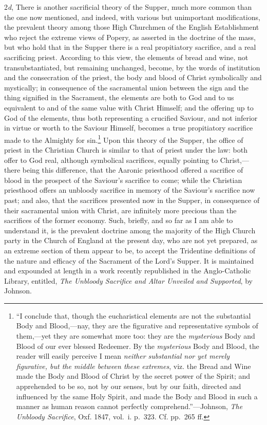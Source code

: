 \documentclass[english,]{book}
\begin{document}
2\emph{d}, There is another sacrificial theory of the Supper, much more common than the one now mentioned, and indeed, with various but unimportant modifications, the prevalent theory among those High Churchmen of the English Establishment who reject the extreme views of Popery, as asserted in the doctrine of the mass, but who hold that in the Supper there is a real propitiatory sacrifice, and a real sacrificing priest. According to this view, the elements of bread and wine, not transubstantiated, but remaining unchanged, become, by the words of institution and the consecration of the priest, the body and blood of Christ symbolically and mystically; in consequence of the sacramental union between the sign and the thing signified in the Sacrament, the elements are both to God and to us equivalent to and of the same value with Christ Himself; and the offering up to God of the elements, thus both representing a crucified Saviour, and not inferior in virtue or worth to the Saviour Himself, becomes a true propitiatory sacrifice made to the Almighty for sin.\footnote{``I conclude that, though the eucharistical elements are not the substantial Body and Blood,---nay, they are the figurative and representative symbols of them,---yet they are somewhat more too: they are the \emph{mysterious} Body and Blood of our ever blessed Redeemer. By the \emph{mysterious} Body and Blood, the reader will easily perceive I mean \emph{neither substantial nor yet merely figurative, but the middle between these extremes}, viz. the Bread and Wine made the Body and Blood of Christ by the secret power of the Spirit; and apprehended to be so, not by our senses, but by our faith, directed and influenced by the same Holy Spirit, and made the Body and Blood in such a manner as human reason cannot perfectly comprehend.''---Johnson, \emph{The Unbloody Sacrifice}, Oxf. 1847, vol.~i. p.~323. Cf. pp.~265 ff.} Upon this theory of the Supper, the office of priest in the Christian Church is similar to that of priest under the law: both offer to God real, although symbolical sacrifices, equally pointing to Christ,---there being this difference, that the Aaronic priesthood offered a sacrifice of blood in the prospect of the Saviour's sacrifice to come; while the Christian priesthood offers an unbloody sacrifice in memory of the Saviour's sacrifice now past; and also, that the sacrifices presented now in the Supper, in consequence of their sacramental union with Christ, are infinitely more precious than the sacrifices of the former economy. Such, briefly, and so far as I am able to understand it, is the prevalent doctrine among the majority of the High Church party in the Church of England at the present day, who are not yet prepared, as an extreme section of them appear to be, to accept the Tridentine definitions of the nature and efficacy of the Sacrament of the Lord's Supper. It is maintained and expounded at length in a work recently republished in the Anglo-Catholic Library, entitled, \emph{The Unbloody Sacrifice and Altar Unveiled and Supported}, by Johnson.
\end{document}
